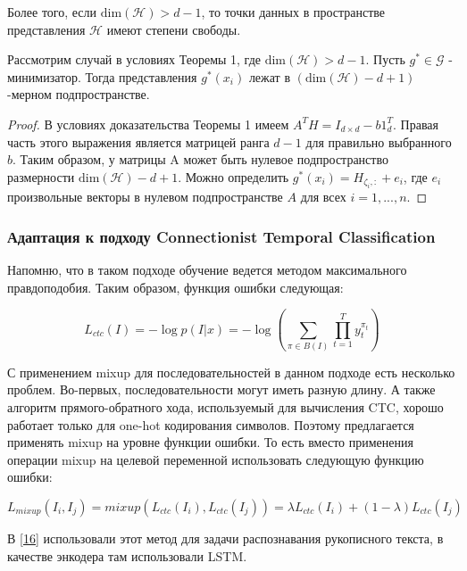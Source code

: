 Более того, если $\text{dim}(\mathcal{H}) > d-1$, то точки данных в пространстве представления $\mathcal{H}$ имеют степени свободы.

\begin{theorem}
Рассмотрим случай в условиях Теоремы 1, где $\text{dim}(\mathcal{H}) > d - 1$. Пусть $g^{*} \in \mathcal{G}$ - минимизатор. Тогда представления $g^{*}(x_i)$ лежат в $(\text{dim}(\mathcal{H}) - d + 1)$-мерном подпространстве.
\end{theorem}

\begin{proof}
В условиях доказательства Теоремы 1 имеем $A^T H = I_{d \times d} - b 1_{d}^{T}$. Правая часть этого выражения является матрицей ранга $d - 1$ для правильно выбранного $b$. Таким образом, у матрицы A может быть нулевое подпространство размерности $\text{dim}(\mathcal{H}) - d + 1$. Можно определить $g^{*}(x_i) = H_{\zeta_i,:} + e_i$, где $e_i$ произвольные векторы в нулевом подпространстве $A$ для всех $i = 1, ..., n$.
\end{proof}

\subsubsection{Адаптация к подходу Connectionist Temporal Classification}
Напомню, что в таком подходе обучение ведется методом максимального правдоподобия. Таким образом, функция ошибки следующая:

\begin{equation}
L_{ctc}(I) = -\log p(I|x) = -\log(\sum_{\pi \in B(I)} \prod_{t=1}^{T} y_{t}^{\pi_{t}})
\end{equation}

С применением mixup для последовательностей в данном подходе есть несколько проблем. Во-первых, последовательности могут иметь разную длину. А также алгоритм прямого-обратного хода, используемый для вычисления CTC, хорошо работает только для one-hot кодирования символов. Поэтому предлагается применять mixup на уровне функции ошибки. То есть вместо применения операции mixup на целевой переменной использовать следующую функцию ошибки:

\begin{equation}
L_{mixup}(I_i, I_j) = mixup(L_{ctc}(I_i), L_{ctc}(I_j)) = \lambda L_{ctc}(I_i) + (1 - \lambda) L_{ctc}(I_j)
\end{equation}

В \hyperlink{cite.Bas19}{[16]} использовали этот метод для задачи распознавания рукописного текста, в качестве энкодера там использовали LSTM. 

\newpage